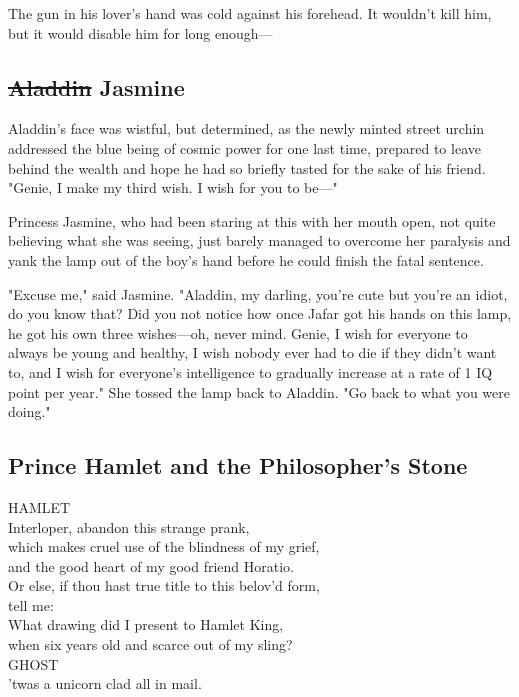 The gun in his lover's hand was cold against his forehead. It wouldn't kill 
him, but it would disable him for long enough---
\sbreak
\vspace{-2\baselineskip}
\subsection{\sout{Aladdin} Jasmine}
Aladdin's face was wistful, but determined, as the newly minted street urchin 
addressed the blue being of cosmic power for one last time, prepared to leave 
behind the wealth and hope he had so briefly tasted for the sake of his friend. 
"Genie, I make my third wish. I wish for you to be---"

Princess Jasmine, who had been staring at this with her mouth open, not quite 
believing what she was seeing, just barely managed to overcome her paralysis 
and yank the lamp out of the boy's hand before he could finish the fatal 
sentence.

"Excuse me," said Jasmine. "Aladdin, my darling, you're cute but you're an 
idiot, do you know that? Did you not notice how once Jafar got his hands on 
this lamp, he got his own three wishes---oh, never mind. Genie, I wish for 
everyone to always be young and healthy, I wish nobody ever had to die if they 
didn't want to, and I wish for everyone's intelligence to gradually increase at 
a rate of 1 IQ point per year." She tossed the lamp back to Aladdin. "Go back 
to what you were doing."
\sbreak
\vspace{-2\baselineskip}
\subsection{Prince Hamlet and the Philosopher's Stone}
\noindent{}HAMLET\\
Interloper, abandon this strange prank,\\
which makes cruel use of the blindness of my grief,\\
and the good heart of my good friend Horatio.\\
Or else, if thou hast true title to this belov'd form,\\
tell me:\\
What drawing did I present to Hamlet King,\\
when six years old and scarce out of my sling?\\

\noindent{}GHOST\\
'twas a unicorn clad all in mail.\\

